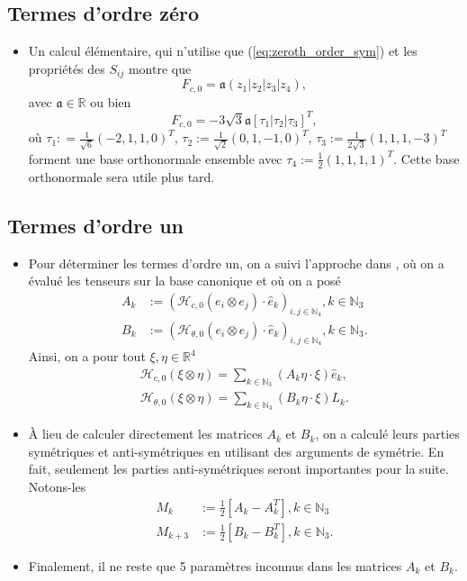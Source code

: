 \documentclass[10pt,a4paper]{article}
\theoremstyle{plain}
\theoremstyle{plain}
\theoremstyle{plain}
\theoremstyle{definition}
\theoremstyle{definition}
\theoremstyle{definition}
\theoremstyle{plain}
\newcommand{\N}{\mathbb{N}}
\newcommand{\R}{\mathbb{R}}
\newcommand{\h}{\mathcal{H}}
\begin{document}
\subsection{Termes d'ordre zéro}
\begin{itemize}
\item Un calcul élémentaire, qui n'utilise que (\ref{eq:zeroth_order_sym}) et les propriétés des $S_{ij}$ montre que
\begin{equation}
	F_{c,0} = \mathfrak{a} (z_1 |z_2| z_3|z_4),
\end{equation}
avec $\mathfrak{a} \in \R$ ou bien
\begin{equation}
	F_{c,0} = - 3 \sqrt{3} \mathfrak{a} [\tau_1| \tau_2 |\tau_3]^T,
\end{equation}
où $\tau_1 : = \tfrac{1}{\sqrt{6}}(-2,1,1,0)^T$, $\tau_2 := \tfrac{1}{\sqrt{2}}(0,1,-1,0)^T$, $\tau_{3}:= \tfrac{1}{2 \sqrt{3}} (1,1,1,-3)^T$ forment une base orthonormale ensemble avec $\tau_4:= \tfrac{1}{2}(1,1,1,1)^T$. Cette base orthonormale sera utile plus tard.
\end{itemize}

\subsection{Termes d'ordre un}
\begin{itemize}
\item Pour déterminer les termes d'ordre un, on a suivi l'approche dans \cite{Alouges2017}, où on a évalué les tenseurs sur la base canonique et où on a posé
\begin{align}
A_k &:= (\h_{c,0}(e_i \otimes e_j)\cdot \hat{e}_k)_{i,j \in \N_4}, k \in \N_3\\
B_k &:= (\h_{\theta,0}(e_i \otimes e_j)\cdot \hat{e}_k)_{i,j \in \N_4}, k \in \N_3.
\end{align}
Ainsi, on a pour tout $\xi, \eta \in \R^4$
\begin{align}
\label{eq: matrix representation of spatial first order term}
	\h_{c,0}(\xi \otimes \eta) = \sum_{k \in \N_3}(A_k \eta \cdot \xi)\hat{e}_k, \\
\label{eq: matrix representation of angular first order term}
	\h_{\theta, 0}(\xi \otimes \eta) = \sum_{k \in \N_3}(B_k \eta \cdot \xi) L_k.
\end{align}

\item À lieu de calculer directement les matrices $A_k$ et $B_k$, on a calculé leurs parties symétriques et anti-symétriques en utilisant des arguments de symétrie. En fait, seulement les parties anti-symétriques seront importantes pour la suite. Notons-les
\begin{align}
M_k &:= \frac{1}{2}[A_k - A_k^T], k \in \N_3\\
M_{k + 3} &:= \frac{1}{2}[B_k - B_k^T], k \in \N_3.
\end{align}

\item Finalement, il ne reste que 5 paramètres inconnus dans les matrices $A_k$ et $B_k$.
\end{itemize}
\end{document}
